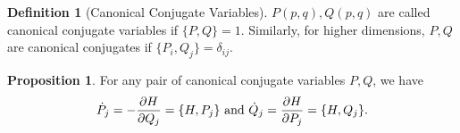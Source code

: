 \documentclass[]{article}
\theoremstyle{definition}
\theoremstyle{definition}
\newtheorem{definition}{Definition}[section]
\newtheorem{proposition}{Proposition}[section]
\begin{document}
\begin{definition}[Canonical Conjugate Variables]
  \(P(p, q), Q(p, q)\) are called canonical conjugate variables if \(\{P, Q\} = 1\). 
  Similarly, for higher dimensions, \(P, Q\) are canonical conjugates if 
  \(\{P_i, Q_j\} = \delta_{ij}\).
\end{definition}

\begin{proposition}
  For any pair of canonical conjugate variables \(P, Q\), we have 
  \[\dot P_j = - \pdv{H}{Q_j} = \{H, P_j\} \text{ and } 
    \dot Q_j = \pdv{H}{P_j} = \{H, Q_j\}.\]
\end{proposition}
\end{document}
